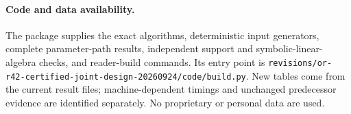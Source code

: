 \paragraph{Code and data availability.}
The package supplies the exact algorithms, deterministic input generators, complete parameter-path results, independent support and symbolic-linear-algebra checks, and reader-build commands. Its entry point is \nolinkurl{revisions/or-r42-certified-joint-design-20260924/code/build.py}. New tables come from the current result files; machine-dependent timings and unchanged predecessor evidence are identified separately. No proprietary or personal data are used.

